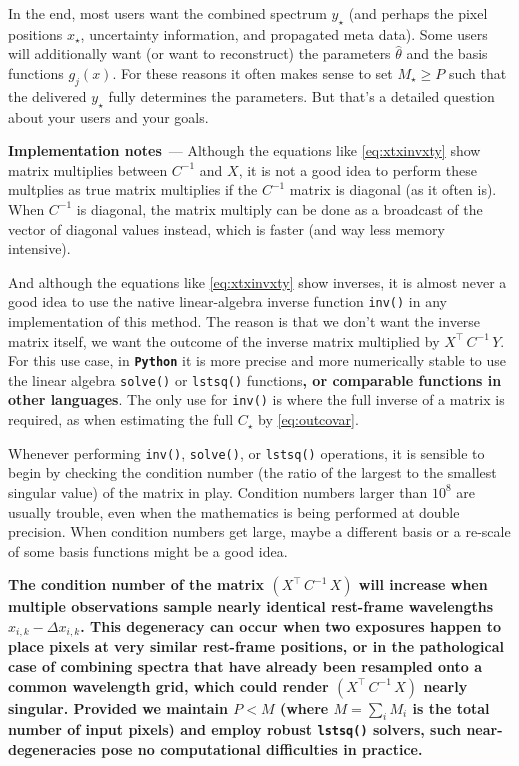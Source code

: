 \documentclass[modern, linenumbers]{aastex631}
\renewcommand{\paragraph}[1]{\medskip\par\noindent\textbf{#1}~---}
\newcommand{\modified}[1]{\textcolor{Emerald}{\textbf{#1}}}
\begin{document}
In the end, most users want the combined spectrum $y_\star$ (and perhaps the pixel positions $x_\star$, uncertainty information, and propagated meta data).
Some users will additionally want (or want to reconstruct) the parameters $\hat\theta$ and the basis functions $g_j(x)$.
For these reasons it often makes sense to set $M_\star\geq P$ such that the delivered $y_\star$ fully determines the parameters.
But that's a detailed question about your users and your goals.

\paragraph{Implementation notes}
Although the equations like \eqref{eq:xtxinvxty} show matrix multiplies between $C^{-1}$ and $X$, it is not a good idea to perform these multplies as true matrix multiplies if the $C^{-1}$ matrix is diagonal (as it often is).
When $C^{-1}$ is diagonal, the matrix multiply can be done as a broadcast of the vector of diagonal values instead, which is faster (and way less memory intensive).

And although the equations like \eqref{eq:xtxinvxty} show inverses, it is almost never a good idea to use the native linear-algebra inverse function \texttt{inv()} in any implementation of this method.
The reason is that we don't want the inverse matrix itself, we want the outcome of the inverse matrix multiplied by $X^\top\,C^{-1}\,Y$.
For this use case, in \modified{\texttt{Python}} it is more precise and more numerically stable to use the linear algebra \texttt{solve()} or \texttt{lstsq()} functions\modified{, or comparable functions in other languages}.
The only use for \texttt{inv()} is where the full inverse of a matrix is required, as when estimating the full $C_\star$ by \eqref{eq:outcovar}. %

Whenever performing \texttt{inv()}, \texttt{solve()}, or \texttt{lstsq()} operations, it is sensible to begin by checking the condition number (the ratio of the largest to the smallest singular value) of the matrix in play.
Condition numbers larger than $10^8$ are usually trouble, even when the mathematics is being performed at double precision.
When condition numbers get large, maybe a different basis or a re-scale of some basis functions might be a good idea.

\modified{The condition number of the matrix $(X^\top\,C^{-1}\,X)$ will increase when multiple observations sample nearly identical rest-frame wavelengths $x_{i,k} - \Delta x_{i,k}$. This degeneracy can occur when two exposures happen to place pixels at very similar rest-frame positions, or in the pathological case of combining spectra that have already been resampled onto a common wavelength grid, which could render $(X^\top\,C^{-1}\,X)$ nearly singular. Provided we maintain $P < M$ (where $M = \sum_i M_i$ is the total number of input pixels) and employ robust \texttt{lstsq()} solvers, such near-degeneracies pose no computational difficulties in practice.}
\end{document}
